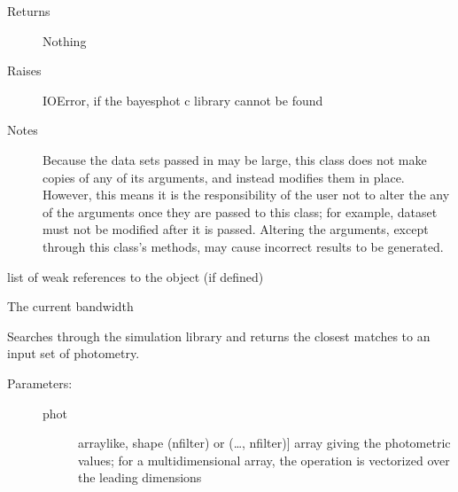 \documentclass[letterpaper,10pt,english]{sphinxmanual}
\begin{document}
\begin{fulllineitems}
\begin{fulllineitems}
\begin{description}
\begin{description}
\end{description}

\item[{Returns}] \leavevmode
Nothing

\item[{Raises}] \leavevmode
IOError, if the bayesphot c library cannot be found

\item[{Notes}] \leavevmode
Because the data sets passed in may be large, this class
does not make copies of any of its arguments, and instead
modifies them in place. However, this means it is the
responsibility of the user not to alter the any of the
arguments once they are passed to this class; for example,
dataset must not be modified after it is passed. Altering the
arguments, except through this class’s methods, may cause
incorrect results to be generated.

\end{description}

\end{fulllineitems}


\begin{fulllineitems}
\label{\detokenize{bayesphot:slugpy.bayesphot.bp.bp.__weakref__}}
list of weak references to the object (if defined)

\end{fulllineitems}


\begin{fulllineitems}
\label{\detokenize{bayesphot:slugpy.bayesphot.bp.bp.bandwidth}}
The current bandwidth

\end{fulllineitems}


\begin{fulllineitems}
\label{\detokenize{bayesphot:slugpy.bayesphot.bp.bp.bestmatch}}
Searches through the simulation library and returns the closest
matches to an input set of photometry.
\begin{description}
\item[{Parameters:}] \leavevmode\begin{description}
\item[{phot}] \leavevmode{[}arraylike, shape (nfilter) or (…, nfilter){]}
array giving the photometric values; for a
multidimensional array, the operation is vectorized over
the leading dimensions


\end{description}
\end{description}
\end{fulllineitems}
\end{fulllineitems}
\end{document}
